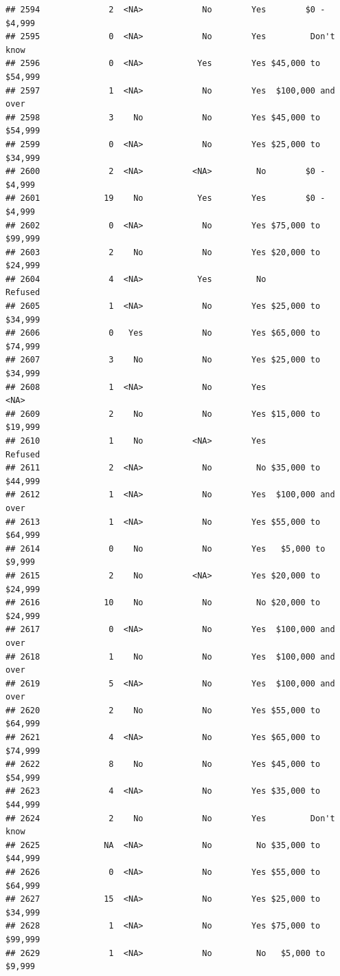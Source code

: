 \documentclass[man]{apa6}
\begin{document}
\begin{verbatim}
## 2594              2  <NA>            No        Yes        $0 - $4,999
## 2595              0  <NA>            No        Yes         Don't know
## 2596              0  <NA>           Yes        Yes $45,000 to $54,999
## 2597              1  <NA>            No        Yes  $100,000 and over
## 2598              3    No            No        Yes $45,000 to $54,999
## 2599              0  <NA>            No        Yes $25,000 to $34,999
## 2600              2  <NA>          <NA>         No        $0 - $4,999
## 2601             19    No           Yes        Yes        $0 - $4,999
## 2602              0  <NA>            No        Yes $75,000 to $99,999
## 2603              2    No            No        Yes $20,000 to $24,999
## 2604              4  <NA>           Yes         No            Refused
## 2605              1  <NA>            No        Yes $25,000 to $34,999
## 2606              0   Yes            No        Yes $65,000 to $74,999
## 2607              3    No            No        Yes $25,000 to $34,999
## 2608              1  <NA>            No        Yes               <NA>
## 2609              2    No            No        Yes $15,000 to $19,999
## 2610              1    No          <NA>        Yes            Refused
## 2611              2  <NA>            No         No $35,000 to $44,999
## 2612              1  <NA>            No        Yes  $100,000 and over
## 2613              1  <NA>            No        Yes $55,000 to $64,999
## 2614              0    No            No        Yes   $5,000 to $9,999
## 2615              2    No          <NA>        Yes $20,000 to $24,999
## 2616             10    No            No         No $20,000 to $24,999
## 2617              0  <NA>            No        Yes  $100,000 and over
## 2618              1    No            No        Yes  $100,000 and over
## 2619              5  <NA>            No        Yes  $100,000 and over
## 2620              2    No            No        Yes $55,000 to $64,999
## 2621              4  <NA>            No        Yes $65,000 to $74,999
## 2622              8    No            No        Yes $45,000 to $54,999
## 2623              4  <NA>            No        Yes $35,000 to $44,999
## 2624              2    No            No        Yes         Don't know
## 2625             NA  <NA>            No         No $35,000 to $44,999
## 2626              0  <NA>            No        Yes $55,000 to $64,999
## 2627             15  <NA>            No        Yes $25,000 to $34,999
## 2628              1  <NA>            No        Yes $75,000 to $99,999
## 2629              1  <NA>            No         No   $5,000 to $9,999

\end{verbatim}
\end{document}

